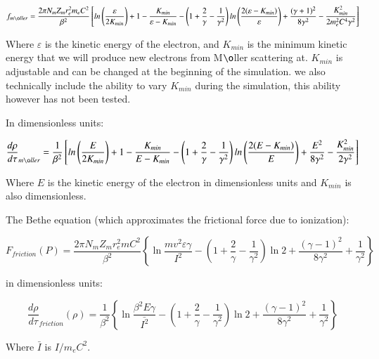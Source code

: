\documentclass[]{article}
\begin{document}
\begin{equation}
f_{m\o ller}=\frac{2\pi N_m Z_m r_e^2 m_e C^2}{\beta^2}\left[ ln\left( \frac{\varepsilon}{2K_{min}} \right) +1 - \frac{K_{min}}{\varepsilon- K_{min}} - \left(1+\frac{2}{\gamma}-\frac{1}{\gamma^2} \right) ln \left(   \frac{2(\varepsilon-K_{min})}{\varepsilon}\right) + \frac{(\gamma+1)^2}{8\gamma^2} - \frac{K_{min}^2}{2m_e^2C^4\gamma^2}   \right] 
\end{equation}

Where $\varepsilon$ is the kinetic energy of the electron, and $K_{min}$ is the minimum kinetic energy that we will produce new electrons from M$\o$ller scattering at. $K_{min}$ is adjustable and can be changed at the beginning of the simulation. we also technically include the ability to vary $K_{min}$ during the simulation, this ability however has not been tested.

In dimensionless units:

\begin{equation}
\frac{d \rho}{d \tau}_{m\o ller}=\frac{1}{\beta^2}\left[ ln\left( \frac{E}{2K_{min}} \right) +1 - \frac{K_{min}}{E- K_{min}} - \left(1+\frac{2}{\gamma}-\frac{1}{\gamma^2} \right) ln \left(   \frac{2(E-K_{min})}{E}\right) + \frac{E^2}{8\gamma^2} - \frac{K_{min}^2}{2\gamma^2}   \right] 
\end{equation}

Where $E$ is the kinetic energy of the electron in dimensionless units and $K_{min}$ is also dimensionless.

The Bethe equation (which approximates the frictional force due to ionization):

\begin{equation} 
F_{friction}(P)  =\frac{ 2 \pi N_m Z_m r_e^2 m C^2}{\beta^2} \left\lbrace  \ln\frac{mv^2\varepsilon\gamma}{I^2}
-\left( 1 + \frac{2}{\gamma}  - \frac{1}{\gamma^2} \right)\ln 2 + \frac{(\gamma-1)^2}{8\gamma^2}  + \frac{1}{\gamma^2} \right\rbrace 
\end{equation}

in dimensionless units:

\begin{equation} 
\frac{d \rho}{d \tau}_{friction}(\rho)  =\frac{ 1 }{\beta^2} \left\lbrace  \ln\frac{\beta^2E\gamma}{\bar{I^2}}
-\left( 1 + \frac{2}{\gamma}  - \frac{1}{\gamma^2} \right)\ln 2 + \frac{(\gamma-1)^2}{8\gamma^2}  + \frac{1}{\gamma^2} \right\rbrace 
\end{equation}

Where $\bar{I}$ is $I/m_eC^2$.
\end{document}
